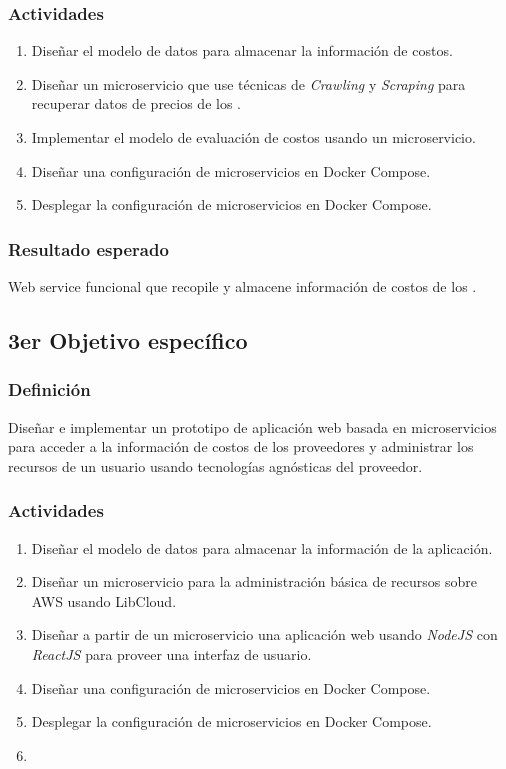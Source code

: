 \subsubsection{Actividades}
\begin{enumerate}
    \item Diseñar el modelo de datos para almacenar la información de costos.
    \item Diseñar un microservicio que use técnicas de \emph{Crawling} y \emph{Scraping} para recuperar datos de precios de los .
    \item Implementar el modelo de evaluación de costos usando un microservicio.
    \item Diseñar una configuración de microservicios en \gls{Docker Compose}.
    \item Desplegar la configuración de microservicios en \gls{Docker Compose}.
\end{enumerate}
\subsubsection{Resultado esperado}
Web service funcional que recopile y almacene información de costos de los .

\subsection{3er Objetivo específico}
\subsubsection{Definición}
Diseñar e implementar un prototipo de aplicación web basada en microservicios para acceder a la información de costos de los proveedores y administrar los recursos de un usuario usando tecnologías agnósticas del proveedor.
\subsubsection{Actividades}
\begin{enumerate}
    \item Diseñar el modelo de datos para almacenar la información de la aplicación.
    \item Diseñar un microservicio para la administración básica de recursos sobre \acrshort{AWS} usando \gls{LibCloud}.
    \item Diseñar a partir de un microservicio una aplicación web usando \emph{NodeJS} con \emph{ReactJS} para proveer una interfaz de usuario.
    \item Diseñar una configuración de microservicios en \gls{Docker Compose}.
    \item Desplegar la configuración de microservicios en \gls{Docker Compose}.
    \item 
\end{enumerate}
